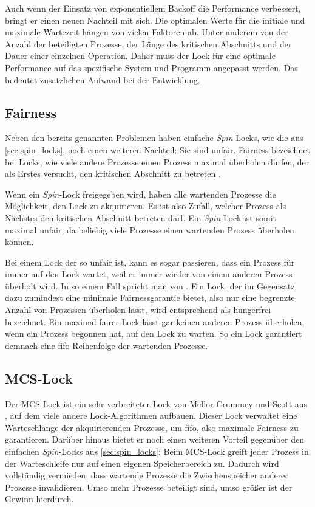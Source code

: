 Auch wenn der Einsatz von exponentiellem Backoff die Performance verbessert,
bringt er einen neuen Nachteil mit sich.
Die optimalen Werte für die initiale und maximale Wartezeit hängen
von vielen Faktoren ab.
Unter anderem von der Anzahl der beteiligten Prozesse,
der Länge des kritischen Abschnitts
und der Dauer einer einzelnen Operation.
Daher muss der Lock für eine optimale Performance auf das spezifische System und Programm angepasst werden.
Das bedeutet zusätzlichen Aufwand bei der Entwicklung.

\subsection{Fairness}
\label{sec:fairness_theoretisch}

Neben den bereits genannten Problemen
haben einfache \textit{Spin}-Locks,
wie die aus \autoref{sec:spin_locks},
noch einen weiteren Nachteil:
Sie sind unfair.
Fairness bezeichnet bei Locks,
wie viele andere Prozesse einen Prozess maximal überholen dürfen,
der als Erstes versucht,
den kritischen Abschnitt zu betreten \cite{fairness}.

Wenn ein \textit{Spin}-Lock freigegeben wird,
haben alle wartenden Prozesse die Möglichkeit,
den Lock zu akquirieren.
Es ist also Zufall,
welcher Prozess als Nächstes den kritischen Abschnitt betreten darf.
Ein \textit{Spin}-Lock ist somit maximal unfair,
da beliebig viele Prozesse einen wartenden Prozess überholen können.

Bei einem Lock der so unfair ist,
kann es sogar passieren,
dass ein Prozess für immer auf den Lock wartet,
weil er immer wieder von einem anderen Prozess überholt wird.
In so einem Fall spricht man von .
Ein Lock,
der im Gegensatz dazu zumindest eine minimale Fairnessgarantie bietet,
also nur eine begrenzte Anzahl von Prozessen überholen lässt,
wird entsprechend als \gls{hungerfrei} bezeichnet.
Ein maximal fairer Lock lässt gar keinen anderen Prozess überholen,
wenn ein Prozess begonnen hat,
auf den Lock zu warten.
So ein Lock garantiert demnach eine \gls{fifo} Reihenfolge der wartenden Prozesse.

\clearpage

\subsection{MCS-Lock}
\label{sec:mcs_lock}

Der MCS-Lock ist ein sehr verbreiteter Lock von Mellor-Crummey und Scott aus \cite{MCS-Lock},
auf dem viele andere Lock-Algorithmen aufbauen.
Dieser Lock verwaltet eine Warteschlange der akquirierenden Prozesse,
um \gls{fifo},
also maximale Fairness zu garantieren.
Darüber hinaus bietet er noch einen weiteren Vorteil
gegenüber den einfachen \textit{Spin}-Locks aus \autoref{sec:spin_locks}:
Beim MCS-Lock greift jeder Prozess in der Warteschleife nur auf einen eigenen Speicherbereich zu.
Dadurch wird vollständig vermieden,
dass wartende Prozesse die \gls{Zwischenspeicher} anderer Prozesse invalidieren.
Umso mehr Prozesse beteiligt sind,
umso größer ist der Gewinn hierdurch.

